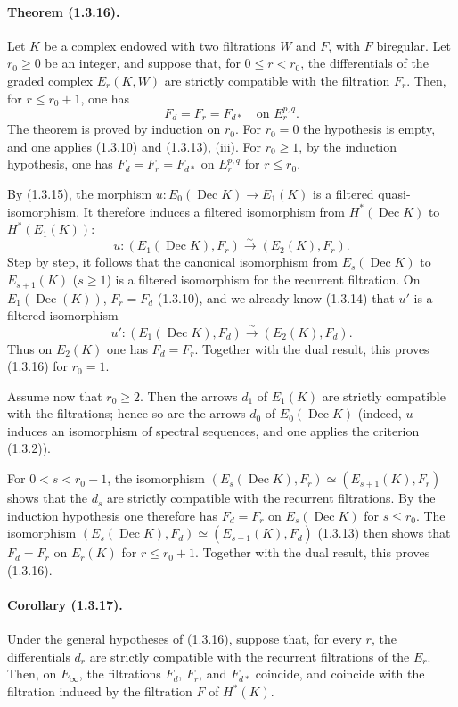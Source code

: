 \documentclass[10pt]{article}
\newcommand{\iso}{\xrightarrow{\sim}}
\newcommand{\Dec}{\operatorname{Dec}}
\begin{document}
\paragraph{Theorem (1.3.16).} Let $K$ be a complex endowed with two filtrations $W$ and $F$, with $F$ biregular. Let $r_0\ge0$ be an integer, and suppose that, for $0\le r<r_0$, the differentials of the graded complex $E_r(K,W)$ are strictly compatible with the filtration $F_r$. Then, for $r\le r_0+1$, one has
\[
F_d=F_r=F_{d*}\quad\text{on }E_r^{p,q}.
\]
The theorem is proved by induction on $r_0$. For $r_0=0$ the hypothesis is empty, and one applies (1.3.10) and (1.3.13), (iii). For $r_0\ge1$, by the induction hypothesis, one has $F_d=F_r=F_{d*}$ on $E_r^{p,q}$ for $r\le r_0$.

By (1.3.15), the morphism $u:E_0(\Dec K)\to E_1(K)$ is a filtered quasi-isomorphism. It therefore induces a filtered isomorphism from $H^*(\Dec K)$ to $H^*(E_1(K))$:
\[
u:(E_1(\Dec K),F_r)\iso(E_2(K),F_r).
\]
Step by step, it follows that the canonical isomorphism from $E_s(\Dec K)$ to $E_{s+1}(K)$ ($s\ge1$) is a filtered isomorphism for the recurrent filtration. On $E_1(\Dec(K))$, $F_r=F_d$ (1.3.10), and we already know (1.3.14) that $u'$ is a filtered isomorphism
\[
u':(E_1(\Dec K),F_d)\iso(E_2(K),F_d).
\]
Thus on $E_2(K)$ one has $F_d=F_r$. Together with the dual result, this proves (1.3.16) for $r_0=1$.

Assume now that $r_0\ge2$. Then the arrows $d_1$ of $E_1(K)$ are strictly compatible with the filtrations; hence so are the arrows $d_0$ of $E_0(\Dec K)$ (indeed, $u$ induces an isomorphism of spectral sequences, and one applies the criterion (1.3.2)).

For $0<s<r_0-1$, the isomorphism $(E_s(\Dec K),F_r)\simeq(E_{s+1}(K),F_r)$ shows that the $d_s$ are strictly compatible with the recurrent filtrations. By the induction hypothesis one therefore has $F_d=F_r$ on $E_s(\Dec K)$ for $s\le r_0$. The isomorphism $(E_s(\Dec K),F_d)\simeq(E_{s+1}(K),F_d)$ (1.3.13) then shows that $F_d=F_r$ on $E_r(K)$ for $r\le r_0+1$. Together with the dual result, this proves (1.3.16).

\paragraph{Corollary (1.3.17).} Under the general hypotheses of (1.3.16), suppose that, for every $r$, the differentials $d_r$ are strictly compatible with the recurrent filtrations of the $E_r$. Then, on $E_\infty$, the filtrations $F_d$, $F_r$, and $F_{d*}$ coincide, and coincide with the filtration induced by the filtration $F$ of $H^*(K)$.
\end{document}

